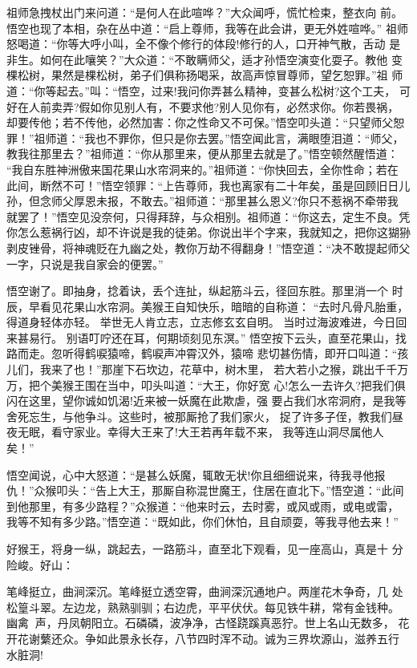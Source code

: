 祖师急拽杖出门来问道：“是何人在此喧哗？”大众闻呼，慌忙检束，整衣向
前。悟空也现了本相，杂在丛中道：“启上尊师，我等在此会讲，更无外姓喧哗。”
祖师怒喝道：“你等大呼小叫，全不像个修行的体段!修行的人，口开神气散，舌动
是非生。如何在此嚷笑？”大众道：“不敢瞒师父，适才孙悟空演变化耍子。教他
变棵松树，果然是棵松树，弟子们俱称扬喝采，故高声惊冒尊师，望乞恕罪。”祖
师道：“你等起去。”叫：“悟空，过来!我问你弄甚么精神，变甚么松树?这个工夫，
可好在人前卖弄?假如你见别人有，不要求他?别人见你有，必然求你。你若畏祸，
却要传他；若不传他，必然加害：你之性命又不可保。”悟空叩头道：“只望师父恕
罪！”祖师道：“我也不罪你，但只是你去罢。”悟空闻此言，满眼堕泪道：“师父，
教我往那里去？”祖师道：“你从那里来，便从那里去就是了。”悟空顿然醒悟道：
“我自东胜神洲傲来国花果山水帘洞来的。”祖师道：“你快回去，全你性命；若在
此间，断然不可！”悟空领罪：“上告尊师，我也离家有二十年矣，虽是回顾旧日儿
孙，但念师父厚恩未报，不敢去。”祖师道：“那里甚么恩义?你只不惹祸不牵带我
就罢了！”悟空见没奈何，只得拜辞，与众相别。祖师道：“你这去，定生不良。凭
你怎么惹祸行凶，却不许说是我的徒弟。你说出半个字来，我就知之，把你这猢狲
剥皮锉骨，将神魂贬在九幽之处，教你万劫不得翻身！”悟空道：“决不敢提起师父
一字，只说是我自家会的便罢。”

悟空谢了。即抽身，捻着诀，丢个连扯，纵起筋斗云，径回东胜。那里消一个
时辰，早看见花果山水帘洞。美猴王自知快乐，暗暗的自称道：
“去时凡骨凡胎重，得道身轻体亦轻。
举世无人肯立志，立志修玄玄自明。
当时过海波难进，今日回来甚易行。
别语叮咛还在耳，何期顷刻见东溟。”
悟空按下云头，直至花果山，找路而走。忽听得鹤唳猿啼，鹤唳声冲霄汉外，猿啼
悲切甚伤情，即开口叫道：“孩儿们，我来了也！”那崖下石坎边，花草中，树木里，
若大若小之猴，跳出千千万万，把个美猴王围在当中，叩头叫道：“大王，你好宽
心!怎么一去许久?把我们俱闪在这里，望你诚如饥渴!近来被一妖魔在此欺虐，强
要占我们水帘洞府，是我等舍死忘生，与他争斗。这些时，被那厮抢了我们家火，
捉了许多子侄，教我们昼夜无眠，看守家业。幸得大王来了!大王若再年载不来，
我等连山洞尽属他人矣！”

悟空闻说，心中大怒道：“是甚么妖魔，辄敢无状!你且细细说来，待我寻他报
仇！”众猴叩头：“告上大王，那厮自称混世魔王，住居在直北下。”悟空道：“此间
到他那里，有多少路程？”众猴道：“他来时云，去时雾，或风或雨，或电或雷，
我等不知有多少路。”悟空道：“既如此，你们休怕，且自顽耍，等我寻他去来！”

好猴王，将身一纵，跳起去，一路筋斗，直至北下观看，见一座高山，真是十
分险峻。好山：

笔峰挺立，曲涧深沉。笔峰挺立透空霄，曲涧深沉通地户。两崖花木争奇，几
处松篁斗翠。左边龙，熟熟驯驯；右边虎，平平伏伏。每见铁牛耕，常有金钱种。
幽禽声，丹凤朝阳立。石磷磷，波净净，古怪跷蹊真恶狞。世上名山无数多，
花开花谢蘩还众。争如此景永长存，八节四时浑不动。诚为三界坎源山，滋养五行
水脏洞!

